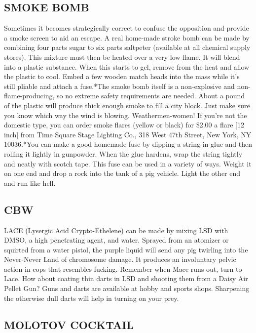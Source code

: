 \documentclass[11pt,twoside,a4paper]{book}
\begin{document}
\subsection{SMOKE BOMB}

	Sometimes it becomes strategically correct to confuse the opposition and provide a smoke screen to aid an escape. A real home-made stroke bomb can be made by combining four parts sugar to six parts saltpeter (available at all chemical supply stores). This mixture must then be heated over a very low flame. It will blend into a plastic substance. When this starts to gel, remove from the heat and allow the plastic to cool. Embed a few wooden match heads into the mass while it's still pliable and attach a fuse.*The smoke bomb itself is a non-explosive and non-flame-producing, so no extreme safety requirements are needed. About a pound of the plastic will produce thick enough smoke to fill a city block. Just make sure you know which way the wind is blowing. Weathermen-women! If you're not the domestic type, you can order smoke flares (yellow or black) for \$2.00 a flare [12 inch] from Time Square Stage Lighting Co., 318 West 47th Street, New York, NY 10036.*You can make a good homemade fuse by dipping a string in glue and then rolling it lightly in gunpowder. When the glue hardens, wrap the string tightly and neatly with scotch tape. This fuse can be used in a variety of ways. Weight it on one end and drop a rock into the tank of a pig vehicle. Light the other end and run like hell.

\subsection{CBW}

LACE (Lysergic Acid Crypto-Ethelene) can be made by mixing LSD with DMSO, a high penetrating agent, and water. Sprayed from an atomizer or squirted from a water pistol, the purple liquid will send any pig twirling into the Never-Never Land of chromosome damage. It produces an involuntary pelvic action in cops that resembles fucking. Remember when Mace runs out, turn to Lace. How about coating thin darts in LSD and shooting them from a Daisy Air Pellet Gun? Guns and darts are available at hobby and sports shops. Sharpening the otherwise dull darts will help in turning on your prey.

\subsection{MOLOTOV COCKTAIL}
\end{document}
